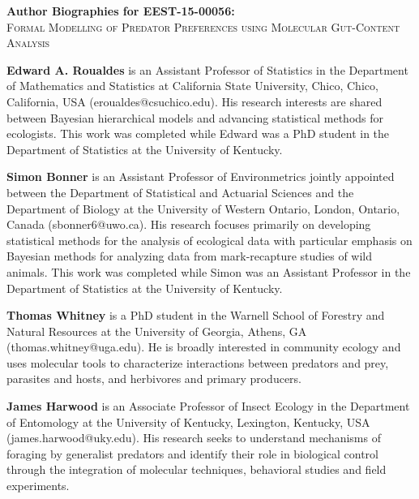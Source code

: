 \documentclass[12pt]{article}
\begin{document}
\begin{center}
  \begin{Large}
    \textbf{Author Biographies for EEST-15-00056:}\\
    \textsc{Formal Modelling of Predator Preferences using Molecular Gut-Content
      Analysis}
  \end{Large}
\end{center}

\textbf{Edward A. Roualdes} is an Assistant Professor of Statistics in the Department of Mathematics and Statistics at California State University, Chico, Chico, California, USA (eroualdes@csuchico.edu).  His research interests are shared between Bayesian hierarchical models and advancing statistical methods for ecologists.  This work was completed while Edward was a PhD student in the Department of Statistics at the University of Kentucky.

\textbf{Simon Bonner} is an Assistant Professor of Environmetrics jointly appointed between the Department of Statistical and Actuarial Sciences and the Department of Biology at the University of Western Ontario, London, Ontario, Canada (sbonner6@uwo.ca). His research focuses primarily on developing statistical methods for the analysis of ecological data with particular emphasis on Bayesian methods for analyzing data from mark-recapture studies of wild animals. This work was completed while Simon was an Assistant Professor in the Department of Statistics at the University of Kentucky.

\textbf{Thomas Whitney} is a PhD student in the Warnell School of Forestry and Natural Resources at the University of Georgia, Athens, GA (thomas.whitney@uga.edu).  He is broadly interested in community ecology and uses molecular tools to characterize interactions between predators and prey, parasites and hosts, and herbivores and primary producers.

\textbf{James Harwood} is an Associate Professor of Insect Ecology in the Department of Entomology at the University of Kentucky, Lexington, Kentucky, USA (james.harwood@uky.edu). His research seeks to understand mechanisms of foraging by generalist predators and identify their role in biological control through the integration of molecular techniques, behavioral studies and field experiments.
\end{document}
